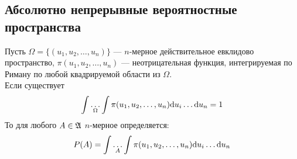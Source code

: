 \subsection{Абсолютно непрерывные вероятностные пространства}
Пусть $\Omega = \{(u_1, u_2, \ldots, u_n)\}$ --- $n$-мерное действительное евклидово пространство,
$\pi(u_1, u_2, \ldots, u_n)$ --- неотрицательная функция, интегрируемая по Риману по любой
квадрируемой области из $\Omega$.\\
Если существует
\begin{equation*}
    \int \underset{\Omega}{\ldots} \int \pi(u_1, u_2, \ldots, u_n) \mathrm{d} u_i \ldots \mathrm{d} u_n = 1
\end{equation*}
То для любого $A \in \frak{A}$ $n$-мерное 
определяется:
\begin{equation*}
    P(A) = \int \underset{A}{\ldots} \int \pi(u_1, u_2, \ldots, u_n) \mathrm{d} u_i \ldots \mathrm{d} u_n
\end{equation*}